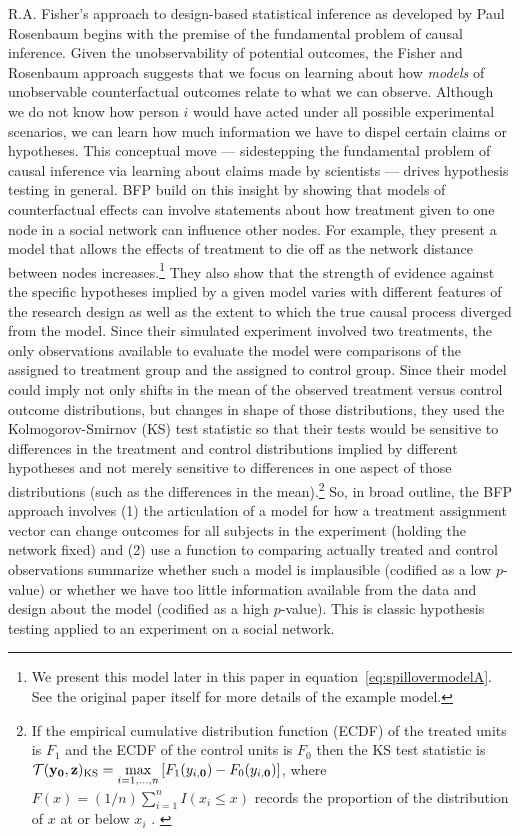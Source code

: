 R.A. Fisher's approach to design-based statistical inference  \citep[Chap
2]{fisher:1935} as developed by Paul Rosenbaum  \citep{rosenbaum2010design}
begins with the premise of the fundamental problem of causal inference. Given
the unobservability of potential outcomes, the Fisher and Rosenbaum approach
suggests that we focus on learning about how \emph{models} of unobservable
counterfactual outcomes relate to what we can observe. Although we do not know
how person $i$ would have acted under all possible experimental scenarios, we
can learn how much information we have to dispel certain claims or hypotheses.
This conceptual move --- sidestepping the fundamental problem of causal
inference via learning about claims made by scientists --- drives hypothesis
testing in general.  BFP build on this insight by showing that models of
counterfactual effects can involve statements about how treatment given to one
node in a social network can influence other nodes. For example, they present
a model that allows the effects of treatment to die off as the network
distance between nodes increases.\footnote{We present this model later in this
  paper in equation~\ref{eq:spillovermodelA}. See the original paper itself for more
  details of the example model.} They also show that the strength of evidence
against the specific hypotheses implied by a given model varies with different
features of the research design as well as the extent to which the true causal
process diverged from the model. Since their simulated experiment involved two
treatments, the only observations available to evaluate the model were
comparisons of the assigned to treatment group and the assigned to control
group. Since their model could imply not only shifts in the mean of the
observed treatment versus control outcome distributions, but changes in shape
of those distributions, they used the Kolmogorov-Smirnov (KS) test statistic
so that their tests would be sensitive to differences in the treatment and
control distributions implied by different hypotheses and not merely sensitive
to differences in one aspect of those distributions (such as the differences
in the mean).\footnote{If the empirical cumulative distribution function
  (ECDF) of the treated units is $F_1$ and the ECDF of the control units is
  $F_0$ then the KS test statistic is $\mathcal{T}(\mathbf{y}_{\mathbf{0}},\mathbf{z})_{\text{KS}} = \underset{i =
    1,\ldots,n}{\text{max}}\left[F_1(y_{i,\mathbf{0}}) -
    F_0(y_{i,\mathbf{0}})\right]$, where $F(x)=(1/n)\sum_{i=1}^n I(x_i \le x)$
  records the proportion of the distribution of $x$ at or below $x_i$
  \citep[\S 5.4]{MylesHollander1999a}. \label{fn:kstest}} So, in broad
outline, the BFP approach involves (1) the articulation of a model for how a
treatment assignment vector can change outcomes for all subjects in the
experiment (holding the network fixed) and (2) use a function to comparing
actually treated and control observations summarize whether such a model is
implausible (codified as a low $p$-value)  or whether we have too little
information available from the data and design about the model (codified as a
high $p$-value). This is classic hypothesis testing applied to an experiment
on a social network.

